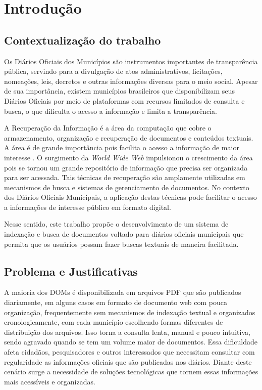 \chapter[Introdução]{Introdução}

\section{Contextualização do trabalho}
Os Diários Oficiais dos Municípios são instrumentos importantes de transparência pública, servindo para a divulgação de atos administrativos, licitações, nomeações, leis, decretos e outras informações diversas para o meio social. Apesar de sua importância, existem municípios brasileiros que disponibilizam seus Diários Oficiais por meio de plataformas com recursos limitados de consulta e busca, o que dificulta o acesso a informação e limita a transparência.

A Recuperação da Informação é a área da computação que cobre o armazenamento, organização e recuperação de documentos e conteúdos textuais. A área é de grande importância pois facilita o acesso a informação de maior interesse \cite{Baeza-Yates2013}. O surgimento da \textit{World Wide Web} impulsionou o crescimento da área pois se tornou um grande repositório de informação que precisa ser organizada para ser acessada. Tais técnicas de recuperação são amplamente utilizadas em mecanismos de busca e sistemas de gerenciamento de documentos. No contexto dos Diários Oficiais Municipais, a aplicação destas técnicas pode facilitar o acesso a informações de interesse público em formato digital.

Nesse sentido, este trabalho propõe o desenvolvimento de um sistema de indexação e busca de documentos voltado para diários oficiais municipais que permita que os usuários possam fazer buscas textuais de maneira facilitada.

\section{Problema e Justificativas}
A maioria dos DOMs é disponibilizada em arquivos PDF que são publicados diariamente, em alguns casos em formato de documento web com pouca organização, frequentemente sem mecanismos de indexação textual e organizados cronologicamente, com cada município escolhendo formas diferentes de distribuição dos arquivos. Isso torna a consulta lenta, manual e pouco intuitiva, sendo agravado quando se tem um volume maior de documentos.
Essa dificuldade afeta cidadãos, pesquisadores e outros interessados que necessitam consultar com regularidade as informações oficiais que são publicadas nos diários.
Diante deste cenário surge a necessidade de soluções tecnológicas que tornem essas informações mais acessíveis e organizadas.

